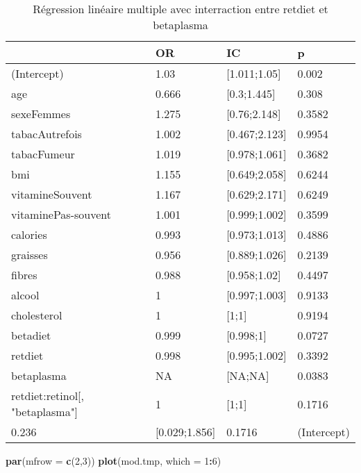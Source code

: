 \documentclass[]{article}
\newenvironment{Shaded}{\begin{snugshade}}{\end{snugshade}}
\newcommand{\KeywordTok}[1]{\textcolor[rgb]{0.13,0.29,0.53}{\textbf{#1}}}
\newcommand{\DataTypeTok}[1]{\textcolor[rgb]{0.13,0.29,0.53}{#1}}
\newcommand{\DecValTok}[1]{\textcolor[rgb]{0.00,0.00,0.81}{#1}}
\newcommand{\OperatorTok}[1]{\textcolor[rgb]{0.81,0.36,0.00}{\textbf{#1}}}
\newcommand{\NormalTok}[1]{#1}
\begin{document}
\begin{table}

\caption{\label{tab:unnamed-chunk-94}Régression linéaire multiple avec interraction entre retdiet et betaplasma}
\centering
\begin{tabular}[t]{l|l|l|l}
\hline
  & OR & IC & p\\
\hline
\rowcolor[HTML]{BBD2E1}  (Intercept) & 1.03 & [1.011;1.05] & 0.002\\
\hline
age & 0.666 & [0.3;1.445] & 0.308\\
\hline
\rowcolor[HTML]{BBD2E1}  sexeFemmes & 1.275 & [0.76;2.148] & 0.3582\\
\hline
tabacAutrefois & 1.002 & [0.467;2.123] & 0.9954\\
\hline
\rowcolor[HTML]{BBD2E1}  tabacFumeur & 1.019 & [0.978;1.061] & 0.3682\\
\hline
bmi & 1.155 & [0.649;2.058] & 0.6244\\
\hline
\rowcolor[HTML]{BBD2E1}  vitamineSouvent & 1.167 & [0.629;2.171] & 0.6249\\
\hline
vitaminePas-souvent & 1.001 & [0.999;1.002] & 0.3599\\
\hline
\rowcolor[HTML]{BBD2E1}  calories & 0.993 & [0.973;1.013] & 0.4886\\
\hline
graisses & 0.956 & [0.889;1.026] & 0.2139\\
\hline
\rowcolor[HTML]{BBD2E1}  fibres & 0.988 & [0.958;1.02] & 0.4497\\
\hline
alcool & 1 & [0.997;1.003] & 0.9133\\
\hline
\rowcolor[HTML]{BBD2E1}  cholesterol & 1 & [1;1] & 0.9194\\
\hline
betadiet & 0.999 & [0.998;1] & 0.0727\\
\hline
\rowcolor[HTML]{BBD2E1}  retdiet & 0.998 & [0.995;1.002] & 0.3392\\
\hline
betaplasma & NA & [NA;NA] & 0.0383\\
\hline
\rowcolor[HTML]{BBD2E1}  retdiet:retinol[, "betaplasma"] & 1 & [1;1] & 0.1716\\
\hline
0.236 & [0.029;1.856] & 0.1716 & (Intercept)\\
\hline
\end{tabular}
\end{table}

\begin{Shaded}
\begin{Highlighting}[]
\KeywordTok{par}\NormalTok{(}\DataTypeTok{mfrow =} \KeywordTok{c}\NormalTok{(}\DecValTok{2}\NormalTok{,}\DecValTok{3}\NormalTok{))}
\KeywordTok{plot}\NormalTok{(mod.tmp, }\DataTypeTok{which =} \DecValTok{1}\OperatorTok{:}\DecValTok{6}\NormalTok{)}
\end{Highlighting}
\end{Shaded}
\end{document}
